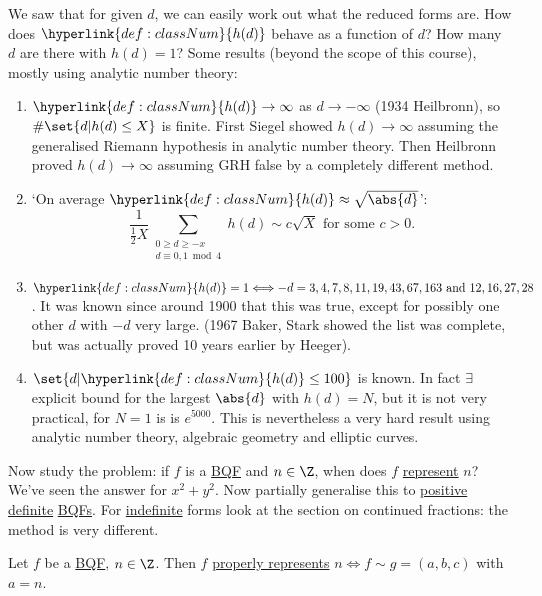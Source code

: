 \documentclass{article}
\begin{document}
We saw that for given $d$, we can easily work out what the reduced forms are.
How does $\hyperlink{def:classNum}{h(d)}$ behave as a function of $d$?
How many $d$ are there with $h(d) = 1$?
Some results (beyond the scope of this course), mostly using analytic number theory:
\begin{enumerate}
    \item $\hyperlink{def:classNum}{h(d)} \to \infty$ as $d \to -\infty$ (1934 Heilbronn), so $\#\set{d | h(d) \leq X}$ is finite.
        First Siegel showed $h(d) \to \infty$ assuming the generalised Riemann hypothesis in analytic number theory.
        Then Heilbronn proved $h(d) \to \infty$ assuming GRH false by a completely different method.
    \item `On average $\hyperlink{def:classNum}{h(d)} \approx \sqrt{\abs{d}}$':
        \begin{equation*}
            \frac{1}{\frac{1}{2} X} \sum_{\substack{0 \geq d \geq -x \\ d\equiv 0,1\bmod{4}}}{h(d)} \sim c \sqrt{X} \text{ for some } c > 0. \tag{1874, Mertens}
        \end{equation*}
    \item $\hyperlink{def:classNum}{h(d)} = 1 \Longleftrightarrow -d = 3,4,7,8,11,19,43,67,163 \text{ and } 12,16,27,28$.
        It was known since around 1900 that this was true, except for possibly one other $d$ with $-d$ very large.
        (1967 Baker, Stark showed the list was complete, but was actually proved 10 years earlier by Heeger).
    \item $\set{d | \hyperlink{def:classNum}{h(d)} \leq 100}$ is known.
        In fact $\exists$ explicit bound for the largest $\abs{d}$ with $h(d) = N$, but it is not very practical, for $N=1$ is is $e^{5000}$.
        This is nevertheless a very hard result using analytic number theory, algebraic geometry and elliptic curves.
\end{enumerate}

Now study the problem: if $f$ is a \hyperlink{def:bqf}{BQF} and $n \in \Z$, when does $f$ \hyperlink{def:rep}{represent} $n$?
We've seen the answer for $x^2 + y^2$.
Now partially generalise this to \hyperlink{def:definite}{positive definite} \hyperlink{def:bqf}{BQFs}.
For \hyperlink{def:definite}{indefinite} forms look at the section on continued fractions: the method is very different.

\begin{nlemma}\label{lem:4.9}
    Let $f$ be a \hyperlink{def:bqf}{BQF}, $n \in \Z$.
    Then $f$ \hyperlink{def:propRep}{properly represents} $n \iff f \sim g = (a, b, c)$ with $a =n$.
\end{nlemma}
\end{document}
